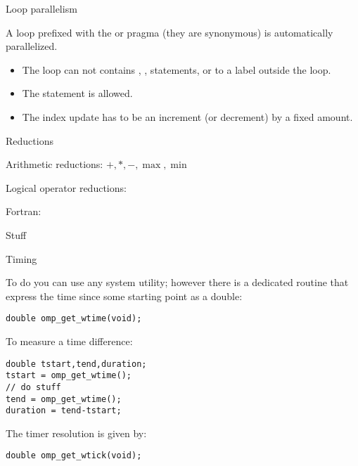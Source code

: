 
 {Loop parallelism}

A loop prefixed with the  or  pragma
(they are synonymous) is automatically parallelized.
\begin{itemize}
\item The loop can not contains , ,  statements, or
   to a label outside the loop.
\item The  statement is allowed.
\item The index update has to be an increment (or decrement) by a fixed amount.
\end{itemize}

 {Reductions}

Arithmetic reductions: $+,*,-,\max,\min$

Logical operator reductions: \n{&,&&,|,||,^}

Fortran: 

 {Stuff}

 {Timing}

To do  you can use any system utility;
however there is a dedicated routine 
that express the time since some starting point as a double:
\begin{verbatim}
double omp_get_wtime(void);
\end{verbatim}
To measure a time difference:
\begin{verbatim}
double tstart,tend,duration;
tstart = omp_get_wtime();
// do stuff
tend = omp_get_wtime();
duration = tend-tstart;
\end{verbatim}
The timer resolution is given by:
\begin{verbatim}
double omp_get_wtick(void);
\end{verbatim}
